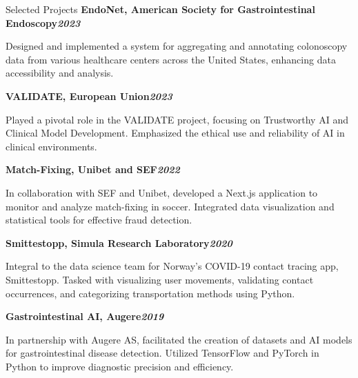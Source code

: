 \begin{rubric}{Selected Projects}
%
\entry*[]%
\textbf{EndoNet, American Society for Gastrointestinal Endoscopy\hfill\textit{}\hfill\textit{2023}} \par
\begin{compactitem}
\item Designed and implemented a system for aggregating and annotating colonoscopy data from various healthcare centers across the United States, enhancing data accessibility and analysis.
\vspace{-12pt}
\end{compactitem}
%
\entry*[]%
\textbf{VALIDATE, European Union\hfill\textit{2023}}
\begin{compactitem}
\item Played a pivotal role in the VALIDATE project, focusing on Trustworthy AI and Clinical Model Development. Emphasized the ethical use and reliability of AI in clinical environments.
\vspace{-12pt}
\end{compactitem}
%
\entry*[]%
\textbf{Match-Fixing, Unibet and SEF\hfill\textit{2022}} \par
\begin{compactitem}
\item In collaboration with SEF and Unibet, developed a Next.js application to monitor and analyze match-fixing in soccer. Integrated data visualization and statistical tools for effective fraud detection.
\vspace{-12pt}
\end{compactitem}
%
\entry*[]%
\textbf{Smittestopp, Simula Research Laboratory\hfill\textit{2020}} \par
\begin{compactitem}
\item Integral to the data science team for Norway's COVID-19 contact tracing app, Smittestopp. Tasked with visualizing user movements, validating contact occurrences, and categorizing transportation methods using Python.
\vspace{-12pt}
\end{compactitem}
%
\entry*[]%
\textbf{Gastrointestinal AI, Augere\hfill\textit{2019}} \par
\begin{compactitem}
\item In partnership with Augere AS, facilitated the creation of datasets and AI models for gastrointestinal disease detection. Utilized TensorFlow and PyTorch in Python to improve diagnostic precision and efficiency.

\end{compactitem}
\end{rubric}
